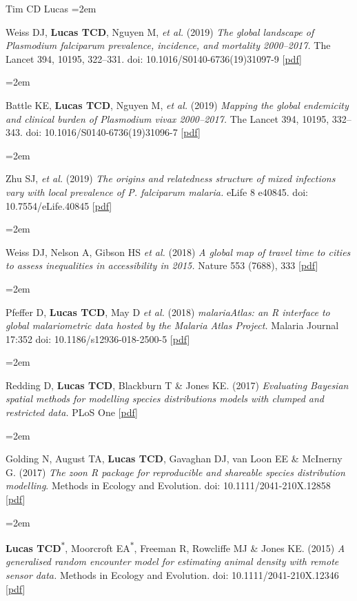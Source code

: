 \documentclass{scrartcl}
\newcommand{\MarginText}[1]{\marginpar{\raggedleft\itshape\small#1}} %
\newcommand{\Description}[1]{\hangindent=2em\hangafter=0\noindent\raggedright\footnotesize{#1}\par\normalsize\vspace{1em}} %
\begin{document}
\begin{cv}{Tim {\Large CD} Lucas}
\Description{\MarginText{2019}Weiss DJ, \textbf{Lucas TCD}, Nguyen M, \emph{et al.} (2019) \emph{The global landscape of \emph{Plasmodium falciparum} prevalence, incidence, and mortality 2000--2017.} The Lancet 394, 10195, 322--331. doi: 10.1016/S0140-6736(19)31097-9 [\href{https://doi.org/10.1016/S0140-6736(19)31097-9}{pdf}]}

\Description{Battle KE, \textbf{Lucas TCD},  Nguyen M, \emph{et al.} (2019) \emph{Mapping the global endemicity and clinical burden of \emph{Plasmodium vivax} 2000--2017.} The Lancet 394, 10195, 332--343. doi: 10.1016/S0140-6736(19)31096-7 [\href{https://doi.org/10.1016/S0140-6736(19)31096-7}{pdf}]}

\Description{Zhu SJ, \emph{et al.} (2019) \emph{The origins and relatedness structure of mixed infections vary with local prevalence of \emph{P. falciparum} malaria.} eLife 8 e40845. doi: 10.7554/eLife.40845 [\href{https://doi.org/10.7554/eLife.40845}{pdf}]}




\Description{\MarginText{2018}Weiss DJ, Nelson A, Gibson HS \emph{et al.} (2018) \emph{A global map of travel time to cities to assess inequalities in accessibility in 2015.} Nature 553 (7688), 333 [\href{https://www.nature.com/articles/nature25181.pdf}{pdf}]}

\Description{Pfeffer D, \textbf{Lucas TCD}, May D \emph{et al.} (2018) \emph{malariaAtlas: an R interface to global malariometric data hosted by the Malaria Atlas Project.} Malaria Journal 17:352 doi: 10.1186/s12936-018-2500-5 [\href{https://malariajournal.biomedcentral.com/track/pdf/10.1186/s12936-018-2500-5}{pdf}]}


\Description{\MarginText{2017}Redding D, \textbf{Lucas TCD}, Blackburn T \& Jones KE. (2017) \emph{Evaluating Bayesian spatial methods for modelling species distributions models with clumped and restricted data.} PLoS One [\href{https://journals.plos.org/plosone/article/file?id=10.1371/journal.pone.0187602&type=printable}{pdf}]}

\Description{Golding N, August TA, \textbf{Lucas TCD}, Gavaghan DJ, van Loon EE \& McInerny G. (2017) \emph{The zoon R package for reproducible and shareable species distribution modelling}. Methods in Ecology and Evolution. doi: 10.1111/2041-210X.12858 [\href{http://onlinelibrary.wiley.com/doi/10.1111/2041-210X.12858/pdf}{pdf}]}

\Description{\MarginText{2015}\textbf{Lucas TCD}\textsuperscript{$\ast$}, Moorcroft EA\textsuperscript{$\ast$}, Freeman R, Rowcliffe MJ \& Jones KE. (2015) \emph{A generalised random encounter model for estimating animal density with remote sensor data.} Methods in Ecology and Evolution. doi: 10.1111/2041-210X.12346 [\href{http://onlinelibrary.wiley.com/doi/10.1111/2041-210X.12346/epdf}{pdf}]}


\end{cv}
\end{document}
